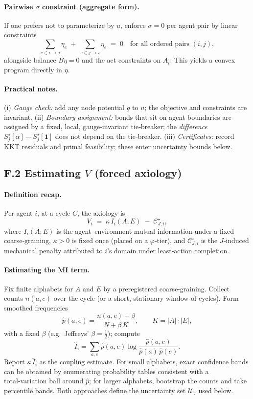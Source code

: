 \documentclass[11pt]{article}
\begin{document}
\paragraph{Pairwise $\sigma$ constraint (aggregate form).}
If one prefers not to parameterize by $u$, enforce $\sigma=0$ per agent pair by linear constraints
\[
\sum_{e\in i\to j} \eta_e\;+\;\sum_{e\in j\to i} \eta_e\;=\;0\quad\text{for all ordered pairs }(i,j),
\]
alongside balance $B\eta=0$ and the act constraints on $A_i$. This yields a convex program directly in $\eta$.

\paragraph{Practical notes.}
(i) \emph{Gauge check:} add any node potential $g$ to $u$; the objective and constraints are invariant. (ii) \emph{Boundary assignment:} bonds that sit on agent boundaries are assigned by a fixed, local, gauge‑invariant tie‑breaker; the \emph{difference} $S_j^\star[\alpha]-S_j^\star[\mathbf{1}]$ does not depend on the tie‑breaker. (iii) \emph{Certificates:} record KKT residuals and primal feasibility; these enter uncertainty bounds below.

\subsection*{F.2 Estimating $V$ (forced axiology)}

\paragraph{Definition recap.}
Per agent $i$, at a cycle $C$, the axiology is
\[
V_i\;=\;\kappa\, I_i(A;E)\;-\;\mathcal{C}_{J,i}^\star,
\]
where $I_i(A;E)$ is the agent–environment mutual information under a fixed coarse‑graining, $\kappa>0$ is fixed once (placed on a $\varphi$‑tier), and $\mathcal{C}_{J,i}^\star$ is the $J$‑induced mechanical penalty attributed to $i$'s domain under least‑action completion.

\paragraph{Estimating the MI term.}
Fix finite alphabets for $A$ and $E$ by a preregistered coarse‑graining. Collect counts $n(a,e)$ over the cycle (or a short, stationary window of cycles). Form smoothed frequencies
\[
\hat p(a,e)=\frac{n(a,e)+\beta}{N+\beta\,K},\qquad K=|A|\cdot|E|,
\]
with a fixed $\beta$ (e.g.\ Jeffreys’ $\beta=\tfrac12$); compute
\[
\widehat{I}_i=\sum_{a,e}\hat p(a,e)\log\frac{\hat p(a,e)}{\hat p(a)\,\hat p(e)}.
\]
Report $\kappa\,\widehat{I}_i$ as the coupling estimate. For small alphabets, exact confidence bands can be obtained by enumerating probability tables consistent with a total‑variation ball around $\hat p$; for larger alphabets, bootstrap the counts and take percentile bands. Both approaches define the uncertainty set $\mathcal{U}_V$ used below.
\end{document}
